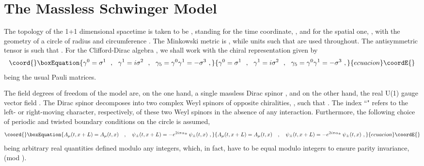 \documentclass[a4paper,11pt]{article}
\def\R{\mathbb R}
\def\Z{\mathbb Z}
\begin{document}
\section{The Massless Schwinger Model}
\label{Sect2}

The topology of the 1+1 dimensional spacetime is taken to be \myHighlight{$\R\times S$}\coordHE{},
\myHighlight{$\R$}\coordHE{} standing for the time coordinate, \coordHE{}, and \coordHE{} for the spatial one, \coordHE{}, 
with the geometry of a circle of radius \coordHE{} and circumference \coordHE{}. The
Minkowski metric is \coordHE{}  \coordHE{}, while units such that \coordHE{} are used throughout.
The antisymmetric tensor \myHighlight{$\epsilon^{\mu\nu}$}\coordHE{} is such that \coordHE{}.
For the Clifford-Dirac algebra \myHighlight{$\{\gamma^\mu,\gamma^\nu\}=2\eta^{\mu\nu}$}\coordHE{},
we shall work with the chiral representation given by
\begin{equation}\coord{}\boxEquation{
\gamma^0=\sigma^1\ \ ,\ \ \gamma^1=i\sigma^2\ \ ,\ \ 
\gamma_5=\gamma^0\gamma^1=-\sigma^3\ ,
}{
\gamma^0=\sigma^1\ \ ,\ \ \gamma^1=i\sigma^2\ \ ,\ \ 
\gamma_5=\gamma^0\gamma^1=-\sigma^3\ ,
}{ecuacion}\coordE{}\end{equation}
\myHighlight{$\sigma^i$}\coordHE{}  \coordHE{} being the usual Pauli matrices.

The field degrees of freedom of the model are, on the one hand, a single
massless Dirac spinor \coordHE{}, and on the other hand, the real U(1) 
gauge vector field \myHighlight{$A_\mu(x^\mu)$}\coordHE{}. The Dirac spinor decomposes into two 
complex Weyl spinors of opposite chiralities, \myHighlight{$\psi=\psi_++\psi_-$}\coordHE{}, such that 
\myHighlight{$\gamma_5\psi_\pm=\mp\psi_\pm$}\coordHE{}. The index ``\myHighlight{$\pm$}\coordHE{}" refers to the left- or 
right-moving character, respectively, of these two Weyl spinors
in the absence of any interaction. Furthermore, the following choice of 
periodic and twisted boundary conditions on the circle is assumed,
\begin{equation}\coord{}\boxEquation{
A_\mu(t,x+L)=A_\mu(t,x)\ \ \ ,\ \ \ 
\psi_\pm(t,x+L)=-e^{2i\pi\alpha_\pm}\,\psi_\pm(t,x)\ ,
}{
A_\mu(t,x+L)=A_\mu(t,x)\ \ \ ,\ \ \ 
\psi_\pm(t,x+L)=-e^{2i\pi\alpha_\pm}\,\psi_\pm(t,x)\ ,
}{ecuacion}\coordE{}\end{equation}
\myHighlight{$\alpha_\pm$}\coordHE{} being arbitrary real quantities defined modulo any integers,
which, in fact, have to be equal modulo integers to ensure parity invariance, 
\myHighlight{$\alpha_+=\alpha=\alpha_-$}\coordHE{} (mod \myHighlight{$\Z$}\coordHE{}).
\end{document}

